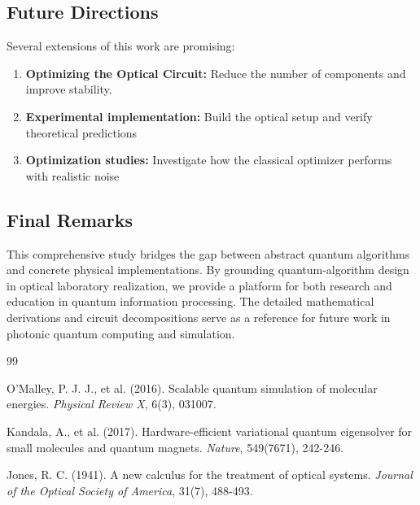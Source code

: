 \documentclass[
	a4paper,
	12pt,
	oneside,
]{article}
\begin{document}
\subsection{Future Directions}

Several extensions of this work are promising:

\begin{enumerate}
    \item \textbf{Optimizing the Optical Circuit:} Reduce the number of components and improve stability.
	\item \textbf{Experimental implementation:} Build the optical setup and verify theoretical predictions
	\item \textbf{Optimization studies:} Investigate how the classical optimizer performs with realistic noise
\end{enumerate}

\subsection{Final Remarks}

This comprehensive study bridges the gap between abstract quantum algorithms and concrete physical implementations. By grounding quantum-algorithm design in optical laboratory realization, we provide a platform for both research and education in quantum information processing. The detailed mathematical derivations and circuit decompositions serve as a reference for future work in photonic quantum computing and simulation.


\clearpage

\begin{thebibliography}{99}

O'Malley, P. J. J., et al. (2016). Scalable quantum simulation of molecular energies. \textit{Physical Review X}, 6(3), 031007.

Kandala, A., et al. (2017). Hardware-efficient variational quantum eigensolver for small molecules and quantum magnets. \textit{Nature}, 549(7671), 242-246.

Jones, R. C. (1941). A new calculus for the treatment of optical systems. \textit{Journal of the Optical Society of America}, 31(7), 488-493.

\end{thebibliography}
\end{document}
